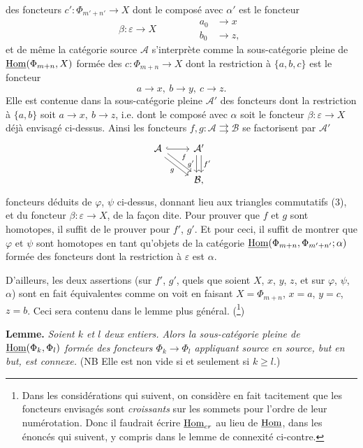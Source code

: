 des foncteurs $c':\Phi_{m'+n'}\longrightarrow X$ dont le composé avec $\alpha'$ est le foncteur
\[
\beta:\varepsilon\longrightarrow X\qquad\qquad
\begin{aligned}
a_0&\longrightarrow x\\
b_0&\longrightarrow z,
\end{aligned} \tag*{$(*)$}
\]
et de même la catégorie source $\mathcal{A}$ s'interprète comme la sous-catégorie pleine de $\underline{\mathrm{Hom}}(\Phi_{m+n},X)$ formée des $c:\Phi_{m+n}\longrightarrow X$ dont la restriction à $\{a,b,c\}$ est le foncteur
\[
a\longrightarrow x,\ b\longrightarrow y,\ c\longrightarrow z.
\]
 Elle est contenue dans la sous-catégorie pleine $\mathcal{A}'$ des foncteurs dont la restriction à $\{a,b\}$ soit $a\longrightarrow x,\ b\longrightarrow z$, i.e. dont le composé avec $\alpha$ soit le foncteur $\beta:\varepsilon\longrightarrow X$ déjà envisagé ci-dessus. Ainsi les foncteurs $f,g:\mathcal{A}\rightrightarrows\mathcal{B}$ se factorisent par $\mathcal{A}'$
\[
\begin{tikzcd}
\mathcal{A} \arrow[r,hook] \arrow[dr,shift left,"f"] \arrow[dr,shift right,"g"'] & \mathcal{A}' \arrow[d,shift right,"g'"'] \arrow[d,shift left,"f'"] \\
 & \mathcal{B},
\end{tikzcd}
\]
foncteurs déduits de $\varphi$, $\psi$ ci-dessus, donnant lieu aux triangles commutatifs (3), et du foncteur $\beta:\varepsilon\longrightarrow X$, de la façon dite. Pour prouver que $f$ et $g$ sont homotopes, il suffit de le prouver pour $f'$, $g'$. Et pour ceci, il suffit de montrer que $\varphi$ et $\psi$ sont homotopes en tant qu'objets de la catégorie $\underline{\mathrm{Hom}}(\Phi_{m+n},\Phi_{m'+n'};\alpha)$ formée des foncteurs dont la restriction à $\varepsilon$ est $\alpha$.

D'ailleurs, les deux assertions (sur $f'$, $g'$, quels que soient $X$, $x$, $y$, $z$, et sur $\varphi$, $\psi$, $\alpha$) sont en fait équivalentes comme on voit en faisant $X=\Phi_{m+n}$, $x=a$, $y=c$, $z=b$. Ceci sera contenu dans le lemme plus général. (\footnote[4]{Dans les considérations qui suivent, on considère en fait tacitement que les foncteurs envisagés sont \textit{croissants} sur les sommets pour l'ordre de leur numérotation. Donc il faudrait écrire $\underline{\mathrm{Hom}}_{cr}$ au lieu de $\underline{\mathrm{Hom}}$, dans les énoncés qui suivent, y compris dans le lemme de connexité ci-contre.})

\textbf{Lemme.} \textit{Soient $k$ et $l$ deux entiers. Alors la sous-catégorie pleine de $\underline{\mathrm{Hom}}(\Phi_k,\Phi_l)$ formée des foncteurs $\Phi_k\longrightarrow\Phi_l$ appliquant source en source, but en but, est connexe.} (NB Elle est non vide si et seulement si $k\geq l$.)

